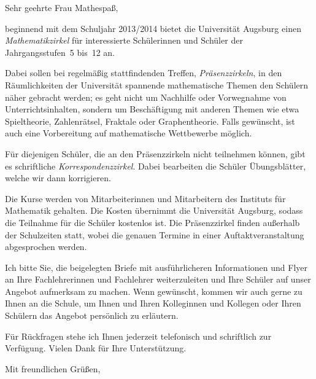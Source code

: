 \documentclass{zirkelbrief}
\begin{document}
\renewcommand{\anschrift}{%
      Holbein-Gymnasium Augsburg \\
      Fachbereich Mathematik \\
      Hallstraße 10 \\
      86150 Augsburg}
\renewcommand{\datum}{2.9.2013}
\renewcommand{\betreff}{Matheschülerzirkel der Universität Augsburg}

\makeletterhead

Sehr geehrte Frau Mathespaß,

beginnend mit dem Schuljahr 2013/2014 bietet die Universität Augsburg
einen \emph{Mathe\-matik\-zir\-kel} für interessierte Schülerinnen und Schüler der
Jahrgangsstufen~5 bis~12 an.

Dabei sollen bei regelmäßig stattfindenden Treffen, \emph{Präsenzzirkeln}, in
den Räum\-lich\-kei\-ten der Universität spannende mathematische Themen den Schülern
näher gebracht werden; es geht nicht um Nachhilfe oder Vorwegnahme von
Unterrichtsinhalten, sondern um Beschäftigung mit anderen Themen wie etwa
Spieltheorie, Zahlenrätsel, Fraktale oder Graphentheorie. Falls gewünscht, ist
auch eine Vorbereitung auf mathematische Wettbewerbe möglich.

Für diejenigen Schüler, die an den Präsenzzirkeln nicht teilnehmen können, gibt
es schriftliche \emph{Korrespondenzzirkel}. Dabei bearbeiten die Schüler
Übungsblätter, welche wir dann korrigieren.

Die Kurse werden von Mitarbeiterinnen und Mitarbeitern des
Instituts für Mathematik gehalten. Die Kosten übernimmt die Universität Augsburg, sodass
die Teilnahme für die Schüler kostenlos ist. Die Präsenzzirkel finden
außerhalb der Schulzeiten statt, wobei die genauen Termine in einer
Auftaktveranstaltung abgesprochen werden.

Ich bitte Sie, die beigelegten Briefe mit ausführlicheren Informationen und Flyer an Ihre
Fachlehrerinnen und Fachlehrer weiterzuleiten und Ihre Schüler auf unser
Angebot aufmerksam zu machen. Wenn gewünscht, kommen wir auch gerne zu Ihnen an die
Schule, um Ihnen und Ihren Kolleginnen und Kollegen oder Ihren Schülern das
Angebot persönlich zu erläutern.

Für Rückfragen stehe ich Ihnen jederzeit telefonisch und schriftlich zur
Verfügung. Vielen Dank für Ihre Unterstützung.

Mit freundlichen Grüßen,
\end{document}
